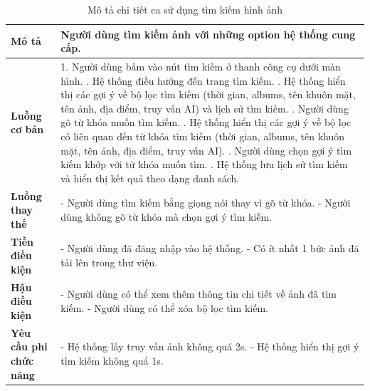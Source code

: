 \noindent 
\begin{xltabular}{\linewidth}{| l | X |} 
\caption{Mô tả chi tiết ca sử dụng tìm kiếm hình ảnh}
\label{tab:search-image-usecase}\\
\hline 
\textbf{Mô tả} & Người dùng tìm kiếm ảnh với những option hệ thống cung cấp. \\
\hline 
\textbf{Luồng cơ bản} & 1. Người dùng bấm vào nút tìm kiếm ở thanh công cụ dưới màn hình. . Hệ thống điều hướng đến trang tìm kiếm. . Hệ thống hiển thị các gợi ý về bộ lọc tìm kiếm (thời gian, albums, tên khuôn mặt, tên ảnh, địa điểm, truy vấn AI) và lịch sử tìm kiếm. . Người dùng gõ từ khóa muốn tìm kiếm. . Hệ thống hiển thị các gợi ý về bộ lọc có liên quan đến từ khóa tìm kiếm (thời gian, albums, tên khuôn mặt, tên ảnh, địa điểm, truy vấn AI). . Người dùng chọn gợi ý tìm kiếm khớp với từ khóa muốn tìm. . Hệ thống lưu lịch sử tìm kiếm và hiển thị kết quả theo dạng danh sách. \\
\hline
\textbf{Luồng thay thế} & - Người dùng tìm kiếm bằng giọng nói thay vì gõ từ khóa. \newline
                           - Người dùng không gõ từ khóa mà chọn gợi ý tìm kiếm. \\
\hline
\textbf{Tiền điều kiện} & - Người dùng đã đăng nhập vào hệ thống. \newline
                          - Có ít nhất 1 bức ảnh đã tải lên trong thư viện. \\
\hline
\textbf{Hậu điều kiện} & - Người dùng có thể xem thêm thông tin chi tiết về ảnh đã tìm kiếm. \newline
                          - Người dùng có thể xóa bộ lọc tìm kiếm. \\
\hline 
\textbf{Yêu cầu phi chức năng} & - Hệ thống lấy truy vấn ảnh không quá 2s. \newline
                            - Hệ thống hiển thị gợi ý tìm kiếm không quá 1s. \\
\hline 
\end{xltabular}


